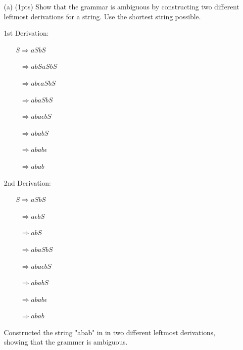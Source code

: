 \documentclass[11pt]{amsart}
\begin{document}
\begin{enumerate}

\item[(a)] (1pts) Show that the grammar is ambiguous by constructing two different leftmost derivations for a string. Use the shortest string possible. 

\vspace{0.25cm}

1st Derivation:

\vspace{0.25cm}

\begin{enumerate}
	\item [] $S \Rightarrow aSbS$
	\item [] $\ \ \ \Rightarrow abSaSbS$
	\item [] $\ \ \ \Rightarrow ab\epsilon aSbS$
	\item [] $\ \ \ \Rightarrow abaSbS$
	\item [] $\ \ \ \Rightarrow aba\epsilon bS$
	\item [] $\ \ \ \Rightarrow ababS$
	\item [] $\ \ \ \Rightarrow abab\epsilon$
	\item [] $\ \ \ \Rightarrow abab$
\end{enumerate}

\vspace{0.25cm}

2nd Derivation:

\vspace{0.25cm}

\begin{enumerate}
	\item [] $S \Rightarrow aSbS$
	\item [] $\ \ \ \Rightarrow a\epsilon bS$
	\item [] $\ \ \ \Rightarrow abS$
	\item [] $\ \ \ \Rightarrow abaSbS$
	\item [] $\ \ \ \Rightarrow aba\epsilon bS$
	\item [] $\ \ \ \Rightarrow ababS$
	\item [] $\ \ \ \Rightarrow abab\epsilon$
	\item [] $\ \ \ \Rightarrow abab$
\end{enumerate}

\vspace{0.25cm}

Constructed the string "abab" in in two different leftmost derivations, showing that the grammer is ambiguous.


\end{enumerate}
\end{document}

